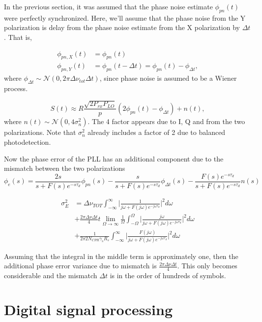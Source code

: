 \documentclass[a4paper]{article}
\begin{document}
In the previous section, it was assumed that the phase noise estimate $\phi_{pn}(t)$ were perfectly synchronized. Here, we'll assume that the phase noise from the Y polarization is delay from the phase noise estimate from the X polarization by $\Delta t$. That is,

\begin{align}
\phi_{pn, X}(t) &= \phi_{pn}(t) \\
\phi_{pn, Y}(t)& = \phi_{pn}(t-\Delta t) = \phi_{pn}(t) - \phi_{\Delta t},
\end{align}
where $\phi_{\Delta t} \sim \mathcal{N}(0, 2\pi\Delta\nu_{tot}\Delta t)$, since phase noise is assumed to be a Wiener process.

\begin{equation}
S(t) \approx R\frac{\sqrt{2P_{rx}P_{LO}}}{p}(2\phi_{pn}(t) - \phi_{\Delta t}) + n(t),
\end{equation}
where $n(t) \sim\mathcal{N}(0, 4\sigma_n^2)$. The 4 factor appears due to I, Q and from the two polarizations. Note that $\sigma_n^2$ already includes a factor of 2 due to balanced photodetection. 

Now the phase error of the PLL has an additional component due to the mismatch between the two polarizations
\begin{equation}
\phi_e(s) = \frac{2s}{s + F(s)e^{-s\tau_d}}\phi_{pn}(s) - \frac{s}{s + F(s)e^{-s\tau_d}}\phi_{\Delta t}(s) - \frac{F(s)e^{-s\tau_d}}{s + F(s)e^{-s\tau_d}}n(s)
\end{equation}

\begin{align} \nonumber
\sigma_E^2 &= \Delta\nu_{TOT}\int_{-\infty}^\infty \bigg|\frac{1}{j\omega +  F(j\omega)e^{-j\omega\tau_d}}\bigg|^2d\omega \\
& + \frac{2\pi\Delta\nu\Delta t}{4} t\lim_{\Omega\to\infty}\frac{1}{\Omega}\int_{-\Omega}^\Omega \bigg|\frac{j\omega}{j\omega +  F(j\omega)e^{-j\omega\tau_d}}\bigg|^2d\omega \\
&+ \frac{1}{2\pi 2N_{CPR}\gamma_sR_s}\int_{-\infty}^\infty \bigg|\frac{F(j\omega)}{j\omega + F(j\omega)e^{-j\omega\tau_d}}\bigg|^2d\omega \nonumber
\end{align}

Assuming that the integral in the middle term is approximately one, then the additional phase error variance due to mismatch is $\frac{2\pi\Delta\nu\Delta t}{4}$. This only becomes considerable and the mismatch $\Delta t$ is in the order of hundreds of symbols.

\section{Digital signal processing}
\end{document}
